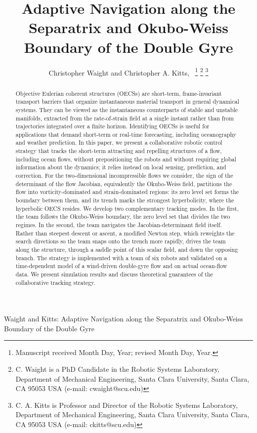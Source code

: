 \documentclass[lettersize,journal]{IEEEtran}
\begin{document}
\title{Adaptive Navigation along the Separatrix and Okubo-Weiss Boundary of the Double Gyre}

\author{Christopher Waight and Christopher A. Kitts,~
\thanks{Manuscript received Month Day, Year; revised Month Day, Year.}
\thanks{C. Waight is a PhD Candidate in the Robotic Systems Laboratory, Department of Mechanical
Engineering, Santa Clara University, Santa Clara, CA 95053 USA (e-mail: cwaight@scu.edu)}
\thanks{C. A. Kitts is Professor and Director of the Robotic Systems Laboratory, Department of
Mechanical Engineering, Santa Clara University, Santa Clara, CA 95053 USA (e-mail: ckitts@scu.edu)}
}
%
{Waight and Kitts: Adaptive Navigation along the Separatrix and Okubo-Weiss Boundary of the Double Gyre}

\maketitle

\begin{abstract}
Objective Eulerian coherent structures (OECSs) are short-term,
frame-invariant transport barriers that organize instantaneous material
transport in general dynamical systems. They can be viewed as the
instantaneous counterparts of stable and unstable manifolds, extracted
from the rate-of-strain field at a single instant rather than from
trajectories integrated over a finite horizon. Identifying OECSs is
useful for applications that demand short-term or real-time forecasting,
including oceanography and weather prediction. In this paper, we present
a collaborative robotic control strategy that tracks the short-term
attracting and repelling structures of a flow, including ocean flows,
without prepositioning the robots and without requiring global
information about the dynamics; it relies instead on local sensing,
prediction, and correction. For the two-dimensional incompressible flows
we consider, the sign of the determinant of the flow Jacobian,
equivalently the Okubo-Weiss field, partitions the flow into
vorticity-dominated and strain-dominated regions: its zero level set
forms the boundary between them, and its trench marks the strongest
hyperbolicity, where the hyperbolic OECS resides. We develop two
complementary tracking modes. In the first, the team follows the
Okubo-Weiss boundary, the zero level set that divides the two regimes.
In the second, the team navigates the Jacobian-determinant field itself.
Rather than steepest descent or ascent, a modified Newton step, which
reweights the search directions so the team snaps onto the trench more
rapidly, drives the team along the structure, through a saddle point of
this scalar field, and down the opposing branch. The strategy is
implemented with a team of six robots and validated on a time-dependent
model of a wind-driven double-gyre flow and on actual ocean-flow data.
We present simulation results and discuss theoretical guarantees of the
collaborative tracking strategy.
\end{abstract}
\end{document}
